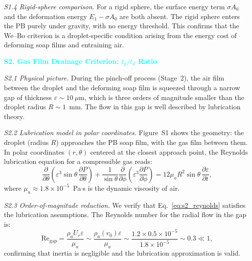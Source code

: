 \documentclass[%
 preprint,
 superscriptaddress,
 amsmath,amssymb,
 aps, prl,
]{revtex4-2}
\begin{document}
{\noindent\textit{S1.4 Rigid-sphere comparison.}}
For a rigid sphere, the surface energy term $\sigma A_0$ and the deformation energy $E_1 - \sigma A_0$ are both absent. The rigid sphere enters the PB purely under gravity, with no energy threshold. This confirms that the We--Bo criterion is a droplet-specific condition arising from the energy cost of deforming soap films and entraining air.\par

\textcolor{cyan}{\textbf{S2. Gas Film Drainage Criterion: $t_p/t_d$ Ratio}}\par

{\noindent\textit{S2.1 Physical picture.}}
During the pinch-off process (Stage~2), the air film between the droplet and the deforming soap film is squeezed through a narrow gap of thickness $\varepsilon \sim 10~\mu\text{m}$, which is three orders of magnitude smaller than the droplet radius $R \sim 1$~mm. The flow in this gap is well described by lubrication theory.\par

{\noindent\textit{S2.2 Lubrication model in polar coordinates.}}
Figure~S1 shows the geometry: the droplet (radius $R$) approaches the PB soap film, with the gas film between them. In polar coordinates $(r,\theta)$ centered at the closest approach point, the Reynolds lubrication equation for a compressible gas reads:
\begin{equation}
\frac{\partial}{\partial\theta}\left(
\varepsilon^3 \sin\theta \,\frac{\partial P}{\partial\theta}
\right)
+ \frac{1}{\sin\theta}\frac{\partial}{\partial\phi}\left(
\varepsilon^3 \frac{\partial P}{\partial\phi}
\right)
= 12\mu_a R^2 \sin\theta \,\frac{\partial\varepsilon}{\partial t},
\label{eq:s2_reynolds}
\end{equation}
where $\mu_a \approx 1.8\times10^{-5}$~Pa$\cdot$s is the dynamic viscosity of air.\par

{\noindent\textit{S2.3 Order-of-magnitude reduction.}}
We verify that Eq.~\eqref{eq:s2_reynolds} satisfies the lubrication assumptions. The Reynolds number for the radial flow in the gap is:
\begin{equation}
\text{Re}_{\text{gap}} = \frac{\rho_a U_r \varepsilon}{\mu_a}
\sim \frac{\rho_a (v_0) \varepsilon}{\mu_a}
\sim \frac{1.2 \times 0.5 \times 10^{-5}}{1.8\times10^{-5}}
\sim 0.3 \ll 1,
\end{equation}
confirming that inertia is negligible and the lubrication approximation is valid.\par
\end{document}
